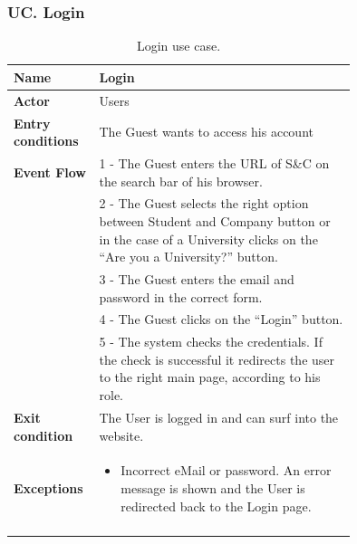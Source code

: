 \subsubsection*{UC\cuc . Login}
\begin{center}
    \begin{longtable}{|l|p{0.75\linewidth}|}
        \hline
        \textbf{Name}               & Login\\
        \hline
        \textbf{Actor}              & Users\\
        \hline
        \textbf{Entry conditions}   & The Guest wants to access his account\\
        \hline
        \textbf{Event Flow}         & 1 - The Guest enters the URL of S\&C on the search bar of his browser.    \\
        & 2 - The Guest selects the right option between Student and Company button or in the case of a University clicks on the “Are you a University?” button. \\
        & 3 - The Guest enters the email and password in the correct form. \\
        & 4 - The Guest clicks on the “Login” button. \\
        & 5 - The system checks the credentials. If the check is successful it redirects the user to the right main page, according to his role.  \\
        \hline
        \textbf{Exit condition}   & The User is logged in and can surf into the website. \\       
        \hline
        \textbf{Exceptions}       & \begin{itemize}
            \item Incorrect eMail or password. An error message is shown and the User is redirected back to the Login page.
        \end{itemize}   \\
        \hline
        \caption{Login use case.}
        \label{tab: login_use_case}
    \end{longtable}
\end{center}


